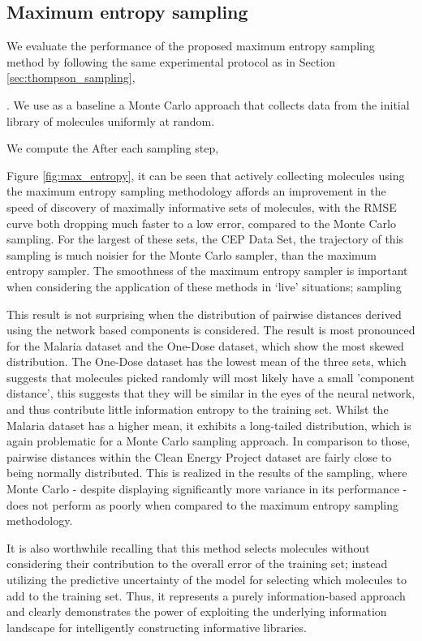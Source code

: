 \subsection{Maximum entropy sampling}

We evaluate the performance of the proposed maximum entropy sampling method by following the same experimental protocol as in Section \ref{sec:thompson_sampling},

. We use as a baseline a Monte Carlo approach that collects data from the initial library of molecules uniformly at random.

We compute the After each sampling step,

Figure \ref{fig:max_entropy}, it can be seen that actively collecting molecules using the maximum entropy sampling methodology affords an improvement in the speed of discovery of maximally informative sets of molecules, with the RMSE curve both dropping much faster to a low error, compared to the Monte Carlo sampling.  For the largest of these sets, the CEP Data Set, the trajectory of this sampling is much noisier for the Monte Carlo sampler, than the maximum entropy sampler.  The smoothness of the maximum entropy sampler is important when considering the application of these methods in `live' situations; sampling 

This result is not surprising when the distribution of pairwise distances derived using the network based components is considered. The result is most pronounced for the Malaria dataset and the One-Dose dataset, which show the most skewed distribution.  The One-Dose dataset has the lowest mean of the three sets, which suggests that molecules picked randomly will most likely have a small 'component distance', this suggests that they will be similar in the eyes of the neural network, and thus contribute little information entropy to the training set. Whilst the Malaria dataset has a higher mean, it exhibits a long-tailed distribution, which is again problematic for a Monte Carlo sampling approach.  In comparison to those, pairwise distances within the Clean Energy Project dataset are fairly close to being normally distributed.  This is realized in the results of the sampling, where Monte Carlo - despite displaying significantly more variance in its performance - does not perform as poorly when compared to the maximum entropy sampling methodology.

It is also worthwhile recalling that this method selects molecules without considering their contribution to the overall error of the training set; instead utilizing the predictive uncertainty of the model for selecting which molecules to add to the training set. Thus, it represents a purely information-based approach and clearly demonstrates the power of exploiting the underlying information landscape for intelligently constructing informative libraries.
